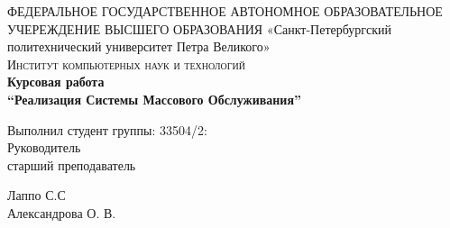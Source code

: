 \documentclass{article}
\begin{document}
	
	\begin{titlepage}
		
		
		\center %
		
		
		ФЕДЕРАЛЬНОЕ ГОСУДАРСТВЕННОЕ АВТОНОМНОЕ ОБРАЗОВАТЕЛЬНОЕ УЧЕРЕЖДЕНИЕ ВЫСШЕГО ОБРАЗОВАНИЯ\linebreak  
		«Санкт-Петербургский политехнический университет Петра Великого»\\[2cm] %
		\textsc{\Large Институт компьютерных наук и технологий}\\[6.5cm] %
		
		
		{ \huge \bfseries Курсовая работа	\\
			\Large \mdseries “Реализация Системы Массового Обслуживания”}\\[6.5cm] %
		
		\begin{multicols}{2}
			\begin{flushright} \large
				
				{Выполнил студент группы: 33504/2:}\\[0.5cm]
				
				{Руководитель\\
					старший преподаватель}
				
			\end{flushright}
			\begin{flushright}
				
				{Лаппо С.С}\\[0.5cm] %
				
				
				Александрова О. В. %
				
			\end{flushright}
		\end{multicols}
		

\end{titlepage}
\end{document}
